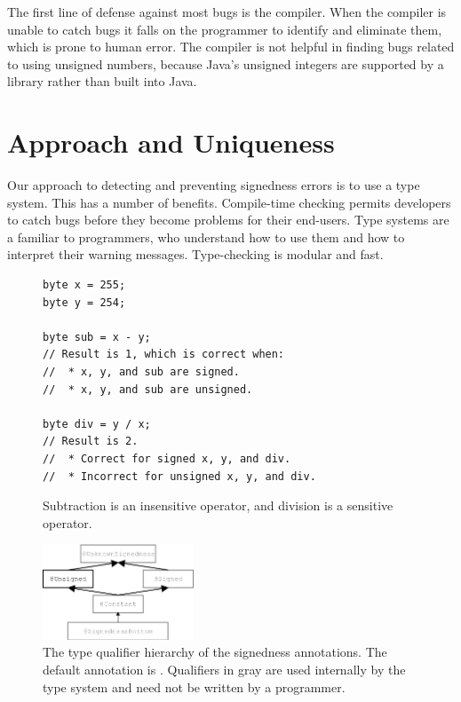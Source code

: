 \documentclass{sig-alternate-05-2015}
\def\<#1>{\codeid{#1}}
\begin{document}
The first line of defense against most bugs is the compiler. When the
compiler is unable to catch bugs it falls on the programmer to identify and
eliminate them, which is prone to human error. The compiler 
is not helpful in finding bugs related to using unsigned
numbers, because Java's unsigned
integers are supported by a library rather than built into Java.


\section{Approach and Uniqueness}

Our approach to detecting and preventing signedness errors is to use a type
system. This has a number of benefits.
%
Compile-time checking permits developers
to catch bugs before they become problems for their end-users.
%
Type systems are a familiar to programmers, who understand how to use them
and how to interpret their warning messages.
%
Type-checking is modular and fast.

\begin{figure}
\begin{lstlisting}
byte x = 255;
byte y = 254;

byte sub = x - y;
// Result is 1, which is correct when:
//  * x, y, and sub are signed.
//  * x, y, and sub are unsigned.

byte div = y / x;
// Result is 2.
//  * Correct for signed x, y, and div.
//  * Incorrect for unsigned x, y, and div.
\end{lstlisting}
\vspace{-10pt}
\caption{Subtraction is an insensitive operator, and
  division is a sensitive operator.}
\label{fig:operators}
\end{figure}


\begin{figure}
    \centering
    \includegraphics[width=0.4\textwidth]{signedness}
    \caption{The type qualifier hierarchy of the signedness annotations.
The default annotation is \<@Signed>.
Qualifiers in gray are used internally by the type system and need not be
written by a programmer.}
    \label{fig:type-hierarchy}
\end{figure}
\end{document}
